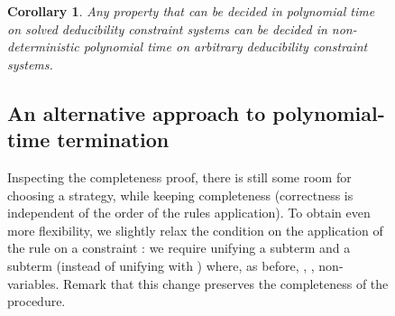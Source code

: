 \documentclass[acmtocl,acmnow]{acmtrans2m}
\newtheorem{corollary}[theorem]{Corollary}
\newcommand{\dedsyss}[1]{deducibility constraint systems}
\begin{document}
\begin{figure}[t]
{{\begin{corollary}\label{corol:general}
Any property  that can be decided
in polynomial time on solved \dedsyss{} can be decided in non-deterministic polynomial
time on arbitrary \dedsyss{}.
\end{corollary}


























































































\subsection{An alternative approach to polynomial-time termination}
\label{section:strategy}


Inspecting the completeness proof, there is still some room for choosing a
strategy, while keeping completeness (correctness is independent
of the order of the rules application). 
To obtain even more flexibility, we slightly relax the condition on
the application of the rule  on a constraint : we
require unifying a subterm  and a subterm 
(instead of unifying  with ) where, as before, , ,
 non-variables.  Remark that this change preserves the
completeness of the procedure.

}}
\end{figure}
\end{document}
